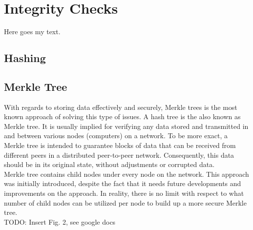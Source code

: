 \section{Integrity Checks}

Here goes my text.

\subsection{Hashing}
\subsection{Merkle Tree}

With regards to storing data effectively and securely, Merkle trees is the most known approach of solving this type of issues. A hash tree is the also known as Merkle tree. It is usually implied for verifying any data stored and transmitted in and between various nodes (computers) on a network. To be more exact, a Merkle tree is intended to guarantee blocks of data that can be received from different peers in a distributed peer-to-peer network. Consequently, this data should be in its original state, without adjustments or corrupted data.\\
Merkle tree contains child nodes under every node on the network. This approach was initially introduced, despite the fact that it needs future developments and improvements on the approach. In reality, there is no limit with respect to what number of child nodes can be utilized per node to build up a more secure Merkle tree.\\
TODO: Insert Fig. 2, see google docs
